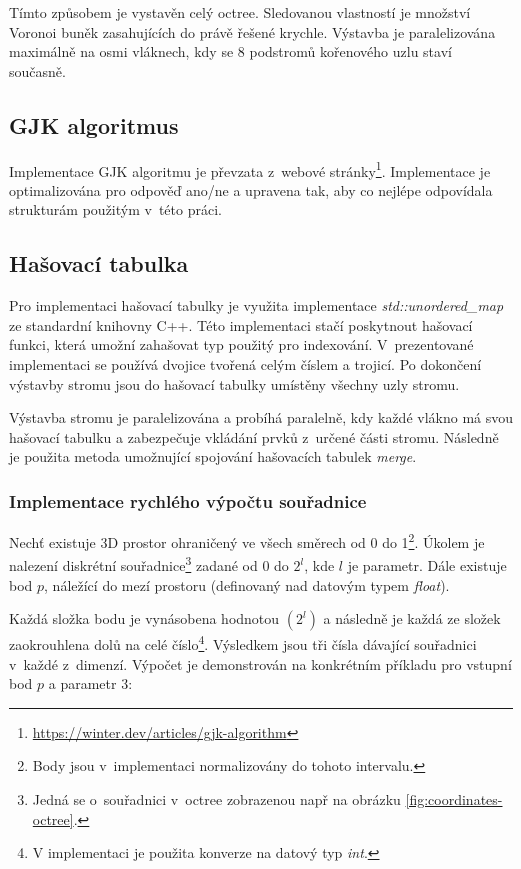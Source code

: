 Tímto způsobem je vystavěn celý octree. Sledovanou vlastností je množství Voronoi buněk zasahujících do právě řešené krychle. Výstavba je paralelizována maximálně na osmi vláknech, kdy se 8 podstromů kořenového uzlu staví současně. 

\subsection*{GJK algoritmus}
Implementace GJK algoritmu je převzata z~webové stránky\footnote{\url{https://winter.dev/articles/gjk-algorithm}}. Implementace je optimalizována pro odpověď ano/ne a upravena tak, aby co nejlépe odpovídala strukturám použitým v~této práci.

\subsection*{Hašovací tabulka}
Pro implementaci hašovací tabulky je využita implementace \emph{std::unordered\_map} ze standardní knihovny C++. Této implementaci stačí poskytnout hašovací funkci, která umožní zahašovat typ použitý pro indexování. V~prezentované implementaci se používá dvojice tvořená celým číslem a trojicí. Po dokončení výstavby stromu jsou do hašovací tabulky umístěny všechny uzly stromu.

Výstavba stromu je paralelizována a probíhá paralelně, kdy každé vlákno má svou hašovací tabulku a zabezpečuje vkládání prvků z~určené části stromu. Následně je použita metoda umožnující spojování hašovacích tabulek \emph{merge}. 

\subsubsection*{Implementace rychlého výpočtu souřadnice}
Nechť existuje 3D prostor ohraničený ve všech směrech od 0 do 1\footnote{Body jsou v~implementaci normalizovány do tohoto intervalu.}. Úkolem je nalezení diskrétní souřadnice\footnote{Jedná se o~souřadnici v~octree zobrazenou např na obrázku \ref{fig:coordinates-octree}.} zadané od 0 do $2^l$, kde $l$ je parametr. Dále existuje bod $p$, náležící do mezí prostoru (definovaný nad datovým typem \emph{float}).

Každá složka bodu je vynásobena hodnotou $(2^l)$ a následně je každá ze složek zaokrouhlena dolů na celé číslo\footnote{V implementaci je použita konverze na datový typ \emph{int}.}. Výsledkem jsou tři čísla dávající souřadnici v~každé z~dimenzí. Výpočet je demonstrován na konkrétním příkladu pro vstupní bod $p$ a parametr 3:

